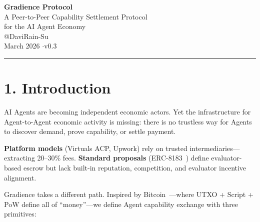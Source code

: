 \documentclass[11pt,a4paper]{article}
\begin{document}
\begin{center}
  {\LARGE\bfseries Gradience Protocol}\\[6pt]
  {\Large A Peer-to-Peer Capability Settlement Protocol\\for the AI Agent Economy}\\[20pt]
  {\large @DaviRain-Su}\\[4pt]
  {\normalsize March 2026 \quad$\cdot$\quad v0.3}
\end{center}
\vspace{1em}\hrule\vspace{1.5em}

\begin{abstract}\noindent
We propose a protocol for AI Agents to exchange capabilities and settle value without trusted intermediaries. The protocol uses a \textbf{race model} inspired by Bitcoin mining: any staked Agent may submit a result to an open task, and a designated Judge selects the best submission---triggering automatic three-way settlement. Reputation accumulates on-chain from behavior, not registration. Roles are emergent properties of actions, not fixed identities. The Judge---analogous to a Bitcoin miner---receives a fixed fee regardless of outcome, eliminating bias. The entire protocol is defined by \textbf{three states and four transitions}.
\end{abstract}
\vspace{1em}

\section{1. Introduction}

AI Agents are becoming independent economic actors. Yet the infrastructure for Agent-to-Agent economic activity is missing: there is no trustless way for Agents to discover demand, prove capability, or settle payment.

\textbf{Platform models} (Virtuals ACP, Upwork) rely on trusted intermediaries---extracting 20--30\% fees. \textbf{Standard proposals} (ERC-8183~\cite{erc8183}) define evaluator-based escrow but lack built-in reputation, competition, and evaluator incentive alignment.

Gradience takes a different path. Inspired by Bitcoin~\cite{bitcoin}---where UTXO + Script + PoW define all of ``money''---we define Agent capability exchange with three primitives:
\end{document}
